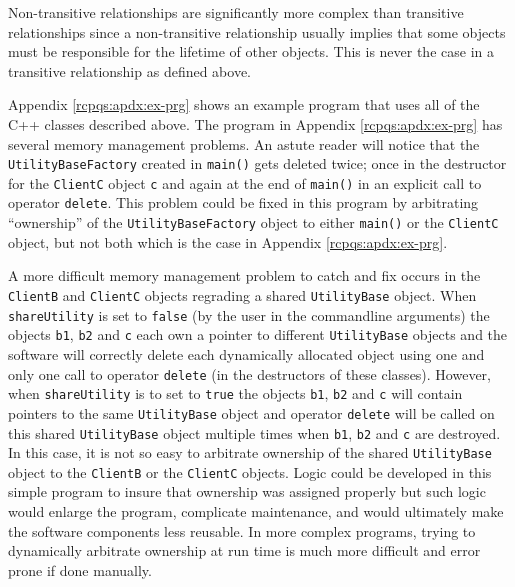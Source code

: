 \documentclass[pdf,ps2pdf,11pt]{SANDreport}
\begin{document}
Non-transitive relationships are significantly more complex than
transitive relationships since a non-transitive relationship usually
implies that some objects must be responsible for the lifetime of
other objects.  This is never the case in a transitive relationship as
defined above.

Appendix {}\ref{rcpqs:apdx:ex-prg} shows an example program that uses
all of the C++ classes described above.  The program in Appendix
{}\ref{rcpqs:apdx:ex-prg} has several memory management problems. An
astute reader will notice that the {}\texttt{Utility\-Base\-Factory}
created in {}\texttt{main()} gets deleted twice; once in the
destructor for the {}\texttt{ClientC} object {}\texttt{c} and again at
the end of {}\texttt{main()} in an explicit call to operator
{}\texttt{delete}.  This problem could be fixed in this program by
arbitrating ``ownership'' of the {}\texttt{Utility\-Base\-Factory}
object to either {}\texttt{main()} or the {}\texttt{ClientC} object,
but not both which is the case in Appendix {}\ref{rcpqs:apdx:ex-prg}.

A more difficult memory management problem to catch and fix occurs in
the {}\texttt{ClientB} and {}\texttt{ClientC} objects regrading a
shared {}\texttt{Utility\-Base} object.  When {}\texttt{shareUtility}
is set to {}\texttt{false} (by the user in the commandline arguments)
the objects {}\texttt{b1}, {}\texttt{b2} and {}\texttt{c} each own a
pointer to different {}\texttt{Utility\-Base} objects and the software
will correctly delete each dynamically allocated object using one and
only one call to operator {}\texttt{delete} (in the destructors of
these classes).  However, when {}\texttt{shareUtility} is to set to
{}\texttt{true} the objects {}\texttt{b1}, {}\texttt{b2} and
{}\texttt{c} will contain pointers to the same
{}\texttt{Utility\-Base} object and operator {}\texttt{delete} will be
called on this shared {}\texttt{Utility\-Base} object multiple times
when {}\texttt{b1}, {}\texttt{b2} and {}\texttt{c} are destroyed.  In
this case, it is not so easy to arbitrate ownership of the shared
{}\texttt{Utility\-Base} object to the {}\texttt{ClientB} or the
{}\texttt{ClientC} objects.  Logic could be developed in this simple
program to insure that ownership was assigned properly but such logic
would enlarge the program, complicate maintenance, and would
ultimately make the software components less reusable.  In more
complex programs, trying to dynamically arbitrate ownership at run
time is much more difficult and error prone if done manually.
\end{document}
